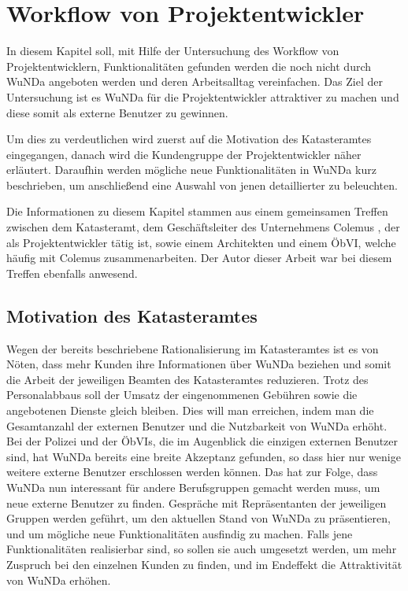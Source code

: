 \chapter{Workflow von Projektentwickler} \label{ch:aussicht}

In diesem Kapitel soll, mit Hilfe der Untersuchung des Workflow von Projektentwicklern, Funktionalitäten gefunden werden die noch nicht durch \ac{WuNDa} angeboten werden und deren Arbeitsalltag vereinfachen.
Das Ziel der Untersuchung ist es \ac{WuNDa} für die Projektentwickler attraktiver zu machen und diese somit als externe Benutzer zu gewinnen.

Um dies zu verdeutlichen wird zuerst auf die Motivation des Katasteramtes eingegangen, danach wird die Kundengruppe der Projektentwickler näher erläutert.
Daraufhin werden mögliche neue Funktionalitäten in \ac{WuNDa} kurz beschrieben, um anschließend eine Auswahl von jenen detaillierter zu beleuchten.

Die Informationen zu diesem Kapitel stammen aus einem gemeinsamen Treffen zwischen dem Katasteramt, dem Geschäftsleiter des Unternehmens Colemus \autocite{colemus}, der als Projektentwickler tätig ist, sowie einem Architekten und einem \ac{ÖbVI}, welche häufig mit Colemus zusammenarbeiten. Der Autor dieser Arbeit war bei diesem Treffen ebenfalls anwesend.

\section{Motivation des Katasteramtes}

Wegen der bereits beschriebene Rationalisierung im Katasteramtes ist es von Nöten, dass mehr Kunden ihre Informationen über \ac{WuNDa} beziehen und somit die Arbeit der jeweiligen Beamten des Katasteramtes reduzieren.
Trotz des Personalabbaus soll der Umsatz der eingenommenen Gebühren sowie die angebotenen Dienste gleich bleiben. Dies will man erreichen, indem man die Gesamtanzahl der externen Benutzer und die Nutzbarkeit von \ac{WuNDa} erhöht.
Bei der Polizei und der \acp{ÖbVI}, die im Augenblick die einzigen externen Benutzer sind, hat \ac{WuNDa} bereits eine breite Akzeptanz gefunden, so dass hier nur wenige weitere externe Benutzer erschlossen werden können. 
Das hat zur Folge, dass \ac{WuNDa} nun interessant für andere Berufsgruppen gemacht werden muss, um neue externe Benutzer zu finden.
Gespräche mit Repräsentanten der jeweiligen Gruppen werden geführt, um den aktuellen Stand von \ac{WuNDa} zu präsentieren, und um mögliche neue Funktionalitäten ausfindig zu machen.
Falls jene Funktionalitäten realisierbar sind, so sollen sie auch umgesetzt werden, um mehr Zuspruch bei den einzelnen Kunden zu finden, und im Endeffekt die Attraktivität von \ac{WuNDa} erhöhen.

